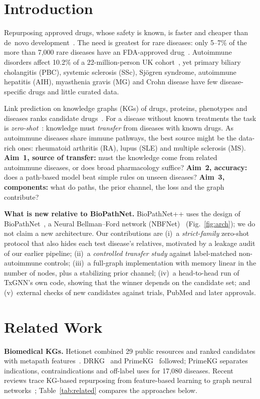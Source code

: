 \documentclass{svproc}
\newcommand{\sysname}{BioPathNet++\xspace}
\begin{document}
\section{Introduction}
Repurposing approved drugs, whose safety is known, is faster and cheaper than de~novo development~\citep{pushpakom2019repurposing}. The need is greatest for rare diseases: only 5--7\% of the more than 7,000 rare diseases have an FDA-approved drug~\citep{huang2024txgnn}. Autoimmune disorders affect 10.2\% of a 22-million-person UK cohort~\citep{conrad2023autoimmune}, yet primary biliary cholangitis (PBC), systemic sclerosis (SSc), Sj\"ogren syndrome, autoimmune hepatitis (AIH), myasthenia gravis (MG) and Crohn disease have few disease-specific drugs and little curated data.

Link prediction on knowledge graphs (KGs) of drugs, proteins, phenotypes and diseases ranks candidate drugs~\citep{himmelstein2017hetionet,bonner2022review}. For a disease without known treatments the task is \emph{zero-shot}~\citep{huang2024txgnn}: knowledge must \emph{transfer} from diseases with known drugs. As autoimmune diseases share immune pathways, the best source might be the data-rich ones: rheumatoid arthritis (RA), lupus (SLE) and multiple sclerosis (MS). \textbf{Aim~1, source of transfer:} must the knowledge come from related autoimmune diseases, or does broad pharmacology suffice? \textbf{Aim~2, accuracy:} does a path-based model beat simple rules on unseen diseases? \textbf{Aim~3, components:} what do paths, the prior channel, the loss and the graph contribute?

\textbf{What is new relative to BioPathNet.} \sysname uses the design of BioPathNet~\citep{hu2026biopathnet}, a Neural Bellman--Ford network (NBFNet)~\citep{zhu2021nbfnet} (Fig.~\ref{fig:arch}); we do not claim a new architecture. Our contributions are (i)~a \emph{strict-family} zero-shot protocol that also hides each test disease's relatives, motivated by a leakage audit of our earlier pipeline; (ii)~a \emph{controlled transfer study} against label-matched non-autoimmune controls; (iii)~a full-graph implementation with memory linear in the number of nodes, plus a stabilizing prior channel; (iv)~a head-to-head run of TxGNN's own code, showing that the winner depends on the candidate set; and (v)~external checks of new candidates against trials, PubMed and later approvals.

\section{Related Work}
\textbf{Biomedical KGs.} Hetionet combined 29 public resources and ranked candidates with metapath features~\citep{himmelstein2017hetionet}. DRKG~\citep{drkg2020} and PrimeKG~\citep{chandak2023primekg} followed; PrimeKG separates indications, contraindications and off-label uses for 17,080 diseases. Recent reviews trace KG-based repurposing from feature-based learning to graph neural networks~\citep{wei2025kgreview,kumar2025scoping}; Table~\ref{tab:related} compares the approaches below.
\end{document}
